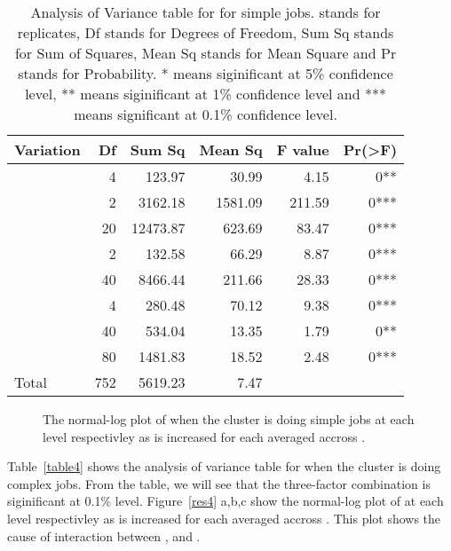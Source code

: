 \documentclass[preprint]{acm_proc_article-sp}
\begin{document}
\begin{table*}
	\caption{Analysis of Variance table for  for simple jobs.  stands for replicates, Df stands for Degrees of Freedom, Sum Sq stands for Sum of Squares, Mean Sq stands for Mean Square and Pr stands for Probability. * means siginificant at 5\% confidence level, ** means siginificant at 1\% confidence level and *** means significant at 0.1\% confidence level.}
	\label{table3}
	\centering
	\begin{tabular}{l|rrrrr}
		\hline\hline
		Variation&Df&Sum Sq&Mean Sq&F value&Pr(>F)\\
		\hline
		&4&123.97&30.99&4.15&0**\\
		&2&3162.18&1581.09&211.59&0***\\
		&20&12473.87&623.69&83.47&0***\\
		&2&132.58&66.29&8.87&0***\\
		&40&8466.44&211.66&28.33&0***\\
		&4&280.48&70.12&9.38&0***\\
		&40&534.04&13.35&1.79&0**\\
		&80&1481.83&18.52&2.48&0***\\
		\hline
		Total&752&5619.23&7.47\\
		\hline\hline
	\end{tabular}
\end{table*}

\begin{figure*}[htb]
        \centering
{}
        \caption{The normal-log plot of  when the cluster is doing simple jobs at each  level respectivley as  is increased for each  averaged accross .}
        \label{res3}
\end{figure*}

Table~\ref{table4} shows the analysis of variance table for  when the cluster is doing complex jobs. From the table, we will see that the three-factor combination  is siginificant at 0.1\% level. Figure~\ref{res4} a,b,c show the normal-log plot of  at each  level respectivley as  is increased for each  averaged accross . This plot shows the cause of interaction between ,  and .
\end{document}
